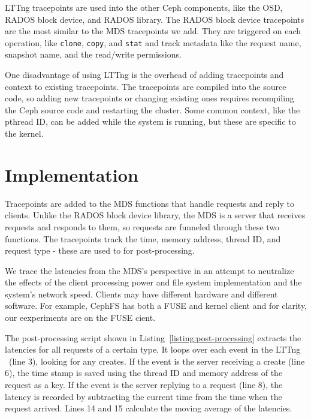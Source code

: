 \documentclass[conference]{acm_proc_article-sp} \usepackage[english]{babel}
\begin{document}

LTTng tracepoints are used into the other Ceph components, like the OSD, RADOS
block device, and RADOS library. The RADOS block device tracepoints are the
most similar to the MDS tracepoints we add. They are triggered on each
operation, like \texttt{clone}, \texttt{copy}, and \texttt{stat} and track
metadata like the request name, snapshot name, and the read/write permissions.


One disadvantage of using LTTng is the overhead of adding tracepoints and
context to existing tracepoints. The tracepoints are compiled into the source
code, so adding new tracepoints or changing existing ones requires recompiling
the Ceph source code and restarting the cluster. Some common context, like the
pthread ID, can be added while the system is running, but these are specific to
the kernel. 

\section{Implementation}

\label{implementation}


Tracepoints are added to the MDS functions that handle requests and reply to
clients. Unlike the RADOS block device library, the MDS is a server that
receives requests and responds to them, so requests are funneled through these
two functions. The tracepoints track the time, memory address, thread ID, and
request type - these are used to for post-processing.


We trace the latencies from the MDS's perspective in an attempt to neutralize
the effects of the client processing power and file system implementation and
the system's network speed. Clients may have different hardware and different
software. For example, CephFS has both a FUSE and kernel client and for
clarity, our eexperiments are on the FUSE cient.


The post-processing script shown in Listing~\ref{listing:post-processing}
extracts the latencies for all requests of a certain type. It loops over each
event in the LTTng \ (line 3), looking for any creates. If the event is the
server receiving a create (line 6), the time stamp is saved using the thread ID
and memory address of the request as a key. If the event is the server replying
to a request (line 8), the latency is recorded by subtracting the current time
from the time when the request arrived. Lines 14 and 15 calculate the moving
average of the latencies.
\end{document}
